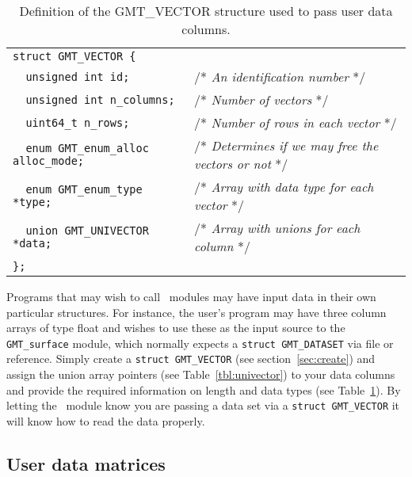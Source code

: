 \documentclass[11pt]{report}
\begin{document}
\begin{table}[h]
\small
\centering
\begin{tabular}{ll} \hline
\verb!struct GMT_VECTOR {!               & \\
\verb!  unsigned int id;!                & /* \emph{An identification number} */ \\
\verb!  unsigned int n_columns;!         & /* \emph{Number of vectors} */\\
\verb!  uint64_t n_rows;!                & /* \emph{Number of rows in each vector} */ \\
\verb!  enum GMT_enum_alloc alloc_mode;! & /* \emph{Determines if we may free the vectors or not} */\\
\verb!  enum GMT_enum_type *type;!       & /* \emph{Array with data type for each vector} */\\
\verb!  union GMT_UNIVECTOR *data;!      & /* \emph{Array with unions for each column} */\\
\verb!};!                                & \\
\hline
\end{tabular}
\caption{Definition of the GMT\_VECTOR structure used to pass user data columns.}
\label{tbl:vector}
\end{table}
\noindent
Programs that may wish to call \GMT\ modules may have input data in their own particular
structures.  For instance, the user's program may have three column arrays of type float
and wishes to use these as the input source to the \texttt{GMT\_surface} module, which normally
expects a \texttt{struct GMT\_DATASET} via file or reference.  Simply create a \texttt{struct GMT\_VECTOR}
(see section~\ref{sec:create}) and assign the union array pointers  (see Table~\ref{tbl:univector}) to your data columns and provide
the required information on length and data types (see Table~\ref{tbl:vector}).
By letting the \GMT\ module know you are passing a data set via a \texttt{struct GMT\_VECTOR} it will know how to
read the data properly.

\subsection{User data matrices}
\end{document}
